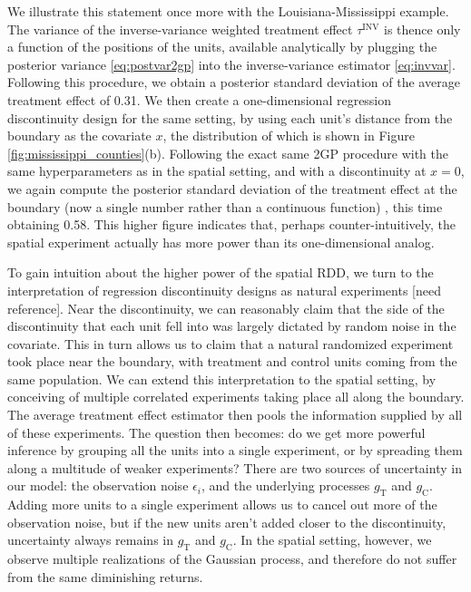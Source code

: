 \documentclass[letter]{article}
\newcommand{\treat}{\mathrm{T}}
\newcommand{\ctrol}{\mathrm{C}}
\newcommand{\invvar}{\tau^{\mathrm{INV}}}
\begin{document}
We illustrate this statement once more with the Louisiana-Mississippi example.
The variance of the inverse-variance weighted treatment effect \(\invvar\) is thence only a function of the positions of the units, available analytically by plugging the posterior variance \eqref{eq:postvar2gp} into the inverse-variance estimator \eqref{eq:invvar}.
Following this procedure, we obtain a posterior standard deviation of the average treatment effect of 0.31.
We then create a one-dimensional regression discontinuity design for the same setting, by using each unit's distance from the boundary as the covariate \(x\), the distribution of which is shown in Figure \ref{fig:mississippi_counties}(b).
Following the exact same 2GP procedure with the same hyperparameters as in the spatial setting, and with a discontinuity at \(x=0\), we again compute the posterior standard deviation of the treatment effect at the boundary (now a single number rather than a continuous function) , this time obtaining 0.58.
This higher figure indicates that, perhaps counter-intuitively, the spatial experiment actually has more power than its one-dimensional analog.

To gain intuition about the higher power of the spatial RDD, we turn to the interpretation of regression discontinuity designs as natural experiments {[}need reference{]}.
Near the discontinuity, we can reasonably claim that the side of the discontinuity that each unit fell into was largely dictated by random noise in the covariate.
This in turn allows us to claim that a natural randomized experiment took place near the boundary, with treatment and control units coming from the same population.
We can extend this interpretation to the spatial setting, by conceiving of multiple correlated experiments taking place all along the boundary.
The average treatment effect estimator then pools the information supplied by all of these experiments.
The question then becomes: do we get more powerful inference by grouping all the units into a single experiment, or by spreading them along a multitude of weaker experiments?
There are two sources of uncertainty in our model: the observation noise \(\epsilon_i\), and the underlying processes \(g_\treat{}\) and \(g_\ctrol{}\). Adding more units to a single experiment allows us to cancel out more of the observation noise, but if the new units aren't added closer to the discontinuity, uncertainty always remains in \(g_\treat{}\) and \(g_\ctrol{}\). In the spatial setting, however, we observe multiple realizations of the Gaussian process, and therefore do not suffer from the same diminishing returns.
    
\end{document}
